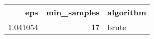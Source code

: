 \begin{tabular}{rrl}
\toprule
eps & min_samples & algorithm \\
\midrule
1.041054 & 17 & brute \\
\bottomrule
\end{tabular}
